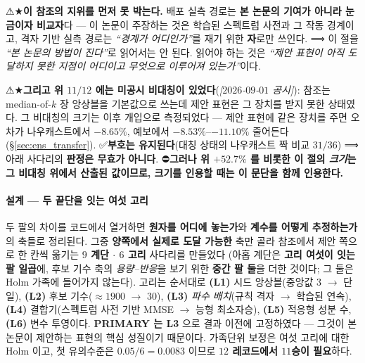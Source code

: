 \documentclass[11pt]{report}
\numberwithin{equation}{chapter}
\numberwithin{figure}{chapter}
\numberwithin{table}{chapter}
\begin{document}
⚠★\textbf{이 참조의 지위를 먼저 못 박는다.} 배포 실측 경로는 \textbf{본 논문의 기여가
아니라 눈금이자 비교자}다 --- 이 논문이 주장하는 것은 학습된 스펙트럼 사전과 그 작동
경계이고, 격자 기반 실측 경로는 \emph{``경계가 어디인가''}를 재기 위한 \textbf{자}로만
쓰인다. ⟹ 이 절을 \emph{``본 논문의 방법이 진다''}로 읽어서는 안 된다. 읽어야 하는 것은
\emph{``제안 표현이 아직 도달하지 못한 지점이 어디이고 무엇으로 이루어져 있는가''}이다.

⚠★\textbf{그리고 위 $11/12$ 에는 미공시 비대칭이 있었다}(\emph{[$2026$-$09$-$01$ 공시]}):
참조는 median-of-$k$ 장 앙상블을 기본값으로 쓰는데 제안 표현은 그 장치를 받지 못한
상태였다. 그 비대칭의 크기는 이후 개입으로 측정되었다 --- 제안 표현에 같은 장치를 주면
오차가 나우캐스트에서 $-8.65\%$, 예보에서 $-8.53\%$--$-11.10\%$ 줄어든다
(\S\ref{sec:ens_transfer}). ✅\textbf{부호는 유지된다}(대칭 상태의 나우캐스트 짝 비교
$31/36$) ⟹ 아래 사다리의 \textbf{판정은 무효가 아니다}. ⛔\textbf{그러나 위 $+52.7\%$ 를
비롯한 이 절의 \emph{크기}는 그 비대칭 위에서 산출된 값이므로, 크기를 인용할 때는 이
문단을 함께 인용한다.}

\paragraph{설계 --- 두 끝단을 잇는 여섯 고리}
두 팔의 차이를 코드에서 열거하면 \textbf{원자를 어디에 놓는가}와 \textbf{계수를 어떻게
추정하는가}의 축들로 정리된다. 그중 \textbf{양쪽에서 실제로 도달 가능한} 축만 골라
참조에서 제안 쪽으로 한 칸씩 옮기는 \textbf{$9$ 계단 $\cdot$ $6$ 고리} 사다리를 만들었다
(아홉 계단은 \textbf{고리 여섯이 잇는 팔 일곱}에, 후보 기수 축의 \emph{용량--반응}을
보기 위한 \textbf{중간 팔 둘}을 더한 것이다; 그 둘은 Holm 가족에 들어가지 않는다).
고리는 순서대로 \textbf{(L1)} 시드 앙상블(중앙값 $3$ $\to$ 단일), \textbf{(L2)} 후보
기수($\approx 1900$ $\to$ $30$), \textbf{(L3)} \emph{파수 배치}(규칙 격자 $\to$ 학습된
연속), \textbf{(L4)} 결합기(스펙트럼 사전 기반 MMSE $\to$ 능형 최소자승), \textbf{(L5)}
적응형 성분 수, \textbf{(L6)} 변수 투영이다. \textbf{PRIMARY 는 L3} 으로 결과 이전에
고정하였다 --- 그것이 본 논문이 제안하는 표현의 핵심 성질이기 때문이다. 가족단위
보정은 여섯 고리에 대한 Holm 이고, 첫 유의수준은 $0.05/6 = 0.0083$ 이므로
\textbf{$12$ 레코드에서 $11$승이 필요}하다.
\end{document}
